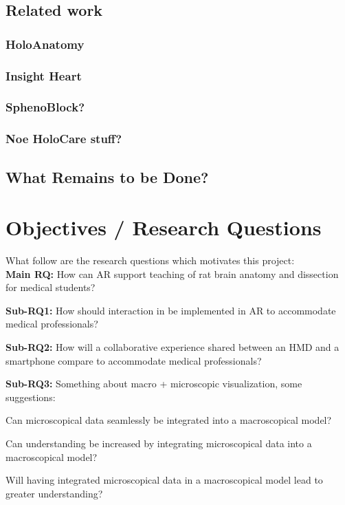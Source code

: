 \subsection{Related work}


\subsubsection*{HoloAnatomy}

\subsubsection*{Insight Heart}

\subsubsection*{SphenoBlock?}

\subsubsection*{Noe HoloCare stuff?}





\subsection*{What Remains to be Done?}

\section{Objectives / Research Questions}
What follow are the research questions which motivates this project: \\
\noindent
\textbf{Main RQ:} How can AR support teaching of rat brain anatomy and dissection for medical students?
\begin{itemize}
    \item {
        \textbf{Sub-RQ1:} How should interaction in be implemented in AR to accommodate medical professionals?
    }
    \item {
        \textbf{Sub-RQ2:} How will a collaborative experience shared between an HMD and a smartphone compare to accommodate medical professionals?
    }
    {
        \newline
        \color{BrickRed}
        \textbf{Sub-RQ3: }
        Something about macro + microscopic visualization, some suggestions:
        \item Can microscopical data seamlessly be integrated into a macroscopical model? 

        \item Can understanding be increased by integrating microscopical data into a macroscopical model?

        \item Will having integrated microscopical data in a macroscopical model lead to greater understanding?
    }
\end{itemize}



